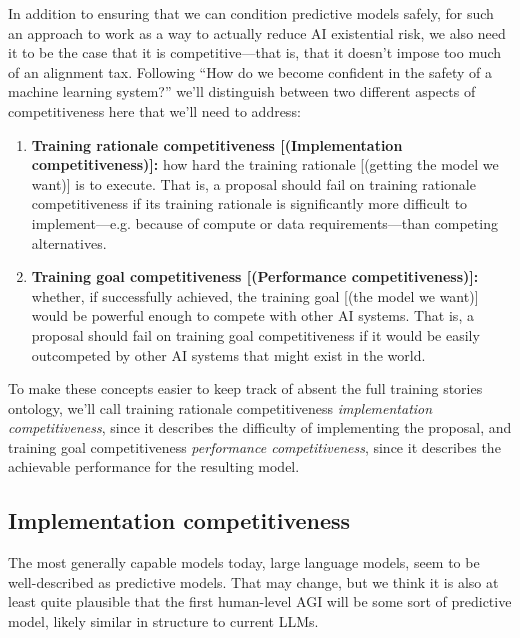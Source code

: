 \documentclass[
  onecolumn,
  natbib,
]{miri-tech-article}
\begin{document}
In addition to ensuring that we can condition predictive models safely, for such an approach to work as a way to actually reduce AI existential risk, we also need it to be the case that it is competitive---that is, that it doesn't impose too much of an alignment tax\cite{paul_christiano_current_work}. Following ``How do we become confident in the safety of a machine learning system?\cite{how_become_confident}'' we'll distinguish between two different aspects of competitiveness here that we'll need to address:

\begin{enumerate}
\item \textbf{Training rationale competitiveness [(Implementation competitiveness)]:} how hard the training rationale [(getting the model we want)] is to execute. That is, a proposal should fail on training rationale competitiveness if its training rationale is significantly more difficult to implement---e.g. because of compute or data requirements---than competing alternatives.
\item \textbf{Training goal competitiveness [(Performance competitiveness)]:} whether, if successfully achieved, the training goal [(the model we want)] would be powerful enough to compete with other AI systems. That is, a proposal should fail on training goal competitiveness if it would be easily outcompeted by other AI systems that might exist in the world.
\end{enumerate}

To make these concepts easier to keep track of absent the full training stories ontology\cite{how_become_confident}, we'll call training rationale competitiveness \textit{implementation competitiveness}, since it describes the difficulty of implementing the proposal, and training goal competitiveness \textit{performance competitiveness}, since it describes the achievable performance for the resulting model.


\subsection{Implementation competitiveness}

The most generally capable models today, large language models, seem to be well-described as predictive models. That may change, but we think it is also at least quite plausible that the first human-level AGI will be some sort of predictive model, likely similar in structure to current LLMs.
\end{document}
